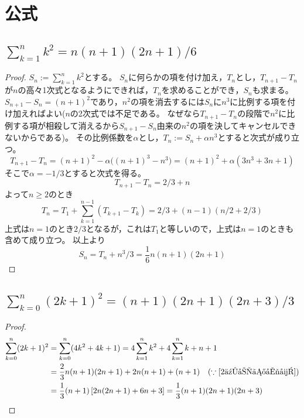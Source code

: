 \chapter{公式}
    \section{\texorpdfstring{$\sum_{k=1}^n k^2 = n(n+1)(2n+1)/6$}{2乗和の公式}}
        \label{2乗和の公式}
        \begin{proof}
            \quad\par
            $S_n := \sum_{k=1}^n k^2$とする。
            $S_n$に何らかの項を付け加え，$T_n$とし，$T_{n+1} - T_n$が$n$の高々1次式となるようにできれば，$T_n$を求めることができ，$S_n$も求まる。
            $S_{n+1} - S_n = (n+1)^2$であり，$n^2$の項を消去するには$S_n$に$n^3$に比例する項を付け加えればよい($n$の2次式では不足である。
            なぜなら$T_{n+1} - T_n$の段階で$n^2$に比例する項が相殺して消えるから$S_{n+1} - S_n$由来の$n^2$の項を決してキャンセルできないからである)。
            その比例係数を$\alpha$とし，$T_n := S_n + \alpha n^3$とすると次式が成り立つ。
            \[ T_{n+1} - T_n = (n+1)^2 - \alpha\bigl((n+1)^3-n^3\bigr) = (n+1)^2 + \alpha(3n^3+3n+1) \]
            そこで$\alpha=-1/3$とすると次式を得る。
            \[ T_{n+1} - T_n = 2/3 + n \]
            よって$n\geq 2$のとき
            \[ T_n = T_1 + \sum_{k=1}^{n-1} (T_{k+1} - T_k) = 2/3 + (n-1)(n/2 + 2/3) \]
            上式は$n=1$のとき$2/3$となるが，これは$T_1$と等しいので，上式は$n=1$のときも含めて成り立つ。
            以上より
            \[ S_n = T_n + n^3/3 = \frac{1}{6}n(n+1)(2n+1) \]
        \end{proof}
    \section{\texorpdfstring{$\sum_{k=0}^n (2k+1)^2 = (n+1)(2n+1)(2n+3)/3$}{奇数の2乗和の公式}}
        \begin{proof}
            \begin{align*}
                \sum_{k=0}^n (2k+1)^2 &= \sum_{k=0}^n (4k^2+4k+1) = 4\sum_{k=1}^n k^2 + 4\sum_{k=1}^n k + n+1 \\
                &= \frac{2}{3}n(n+1)(2n+1) + 2n(n+1) + (n+1) \quad (\because \ref{2乗和の公式}) \\
                &= \frac{1}{3}(n+1)\left[2n(2n+1) + 6n + 3\right] = \frac{1}{3}(n+1)(2n+1)(2n+3)
            \end{align*}
        \end{proof}

